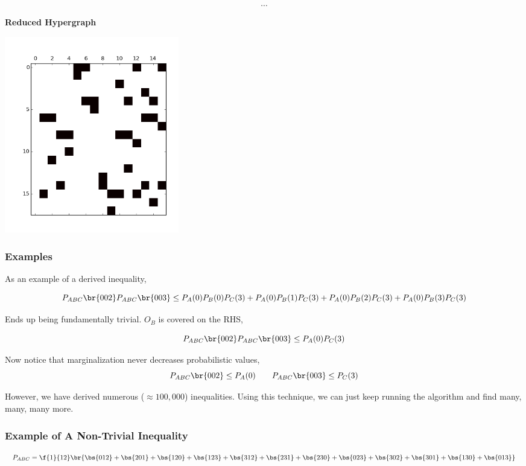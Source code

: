 \documentclass{article}
\theoremstyle{definition}
\begin{document}
    \[ \cdots \]

    \textbf{Reduced Hypergraph}
    \begin{center}
        \includegraphics[width=3in]{figures/reduced_hgraph.png}
    \end{center}

    \subsubsection*{Examples}

    As an example of a derived inequality,

    \[ P_{ABC}\br{002}P_{ABC}\br{003} \leq P_{A}(0)P_{B}(0)P_{C}(3) + P_{A}(0)P_{B}(1)P_{C}(3) + P_{A}(0)P_{B}(2)P_{C}(3) + P_{A}(0)P_{B}(3)P_{C}(3) \]

    Ends up being fundamentally trivial. $O_B$ is covered on the RHS,

    \[ P_{ABC}\br{002}P_{ABC}\br{003} \leq P_{A}(0)P_{C}(3) \]

    Now notice that marginalization never decreases probabilistic values,
    \[P_{ABC}\br{002} \leq P_{A}(0) \qquad P_{ABC}\br{003} \leq P_{C}(3) \]

    However, we have derived numerous ($\approx 100,000$) inequalities. Using this technique, we can just keep running the algorithm and find many, many, many more.

    \subsubsection*{Example of A Non-Trivial Inequality}

    \[ P_{ABC} = \f{1}{12}\br{\bs{012} + \bs{201} + \bs{120} + \bs{123} + \bs{312} + \bs{231} + \bs{230} + \bs{023} + \bs{302} + \bs{301} + \bs{130} + \bs{013}} \]
\end{document}
